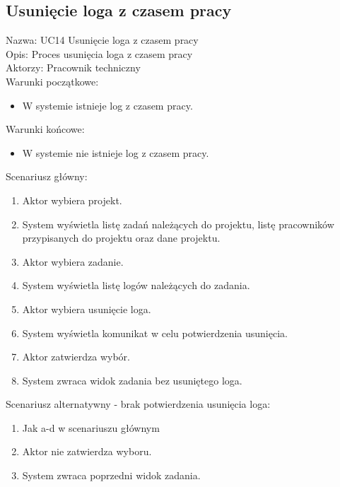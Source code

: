 \subsection{Usunięcie loga z czasem pracy}
Nazwa: UC14 Usunięcie loga z czasem pracy \\
Opis: Proces usunięcia loga z czasem pracy \\
Aktorzy: Pracownik techniczny \\
Warunki początkowe:
\begin{itemize}
\item W systemie istnieje log z czasem pracy.
\end{itemize}
Warunki końcowe:
\begin{itemize}
\item W systemie nie istnieje log z czasem pracy.
\end{itemize}
Scenariusz główny:
\begin{enumerate}
\item Aktor wybiera projekt.
\item System wyświetla listę zadań należących do projektu, listę pracowników przypisanych do projektu oraz dane projektu.
\item Aktor wybiera zadanie.
\item System wyświetla listę logów należących do zadania.
\item Aktor wybiera usunięcie loga.
\item System wyświetla komunikat w celu potwierdzenia usunięcia.
\item Aktor zatwierdza wybór.
\item System zwraca widok zadania bez usuniętego loga.
\end{enumerate}
Scenariusz alternatywny - brak potwierdzenia usunięcia loga: 
\begin{enumerate}
\item Jak a-d w scenariuszu głównym
\item Aktor nie zatwierdza wyboru.
\item System zwraca poprzedni widok zadania.
\end{enumerate}

